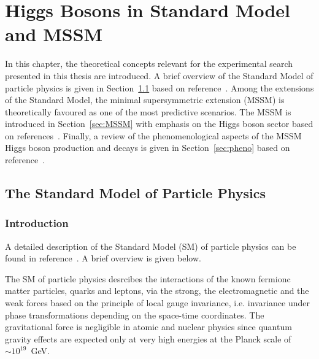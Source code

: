 
\chapter{Higgs Bosons in Standard Model and MSSM} \label{chap:theory}

 \vspace{2cm}

In this chapter,   the theoretical concepts relevant for the experimental search presented in this thesis are introduced.
A brief overview of the Standard Model of particle physics is given in Section~\ref{sec:SM} based on reference~\cite{Altarelli}. 
Among  the extensions of the Standard Model, the minimal supersymmetric 
extension (MSSM) is  theoretically favoured  as one of the most predictive scenarios.
The MSSM is introduced in Section~\ref{sec:MSSM} with  emphasis on the Higgs boson sector
 based on  references~\cite{SusyPrimer,Djuadi}.
Finally, a review of the phenomenological aspects of the MSSM Higgs boson production and decays is given 
in Section~\ref{sec:pheno} based on reference~\cite{LHCxsec}.

\restoregeometry

\clearpage

\section{The Standard Model of Particle Physics} \label{sec:SM}
\subsection{Introduction}
A detailed description of the Standard Model (SM) of particle physics can be found in reference~\cite{Peskin}. A brief overview is
given below.

The SM of particle physics desrcibes the interactions of the known fermionc matter particles, quarks and leptons, via the
strong, the electromagnetic and the weak forces based on  the principle of local gauge invariance,  i.e. invariance under  
phase  transformations depending  on the space-time coordinates.
The gravitational force is negligible in atomic and nuclear physics since 
quantum gravity effects are expected only at very high energies at the  Planck scale of $\sim 10^{19}$~GeV.

